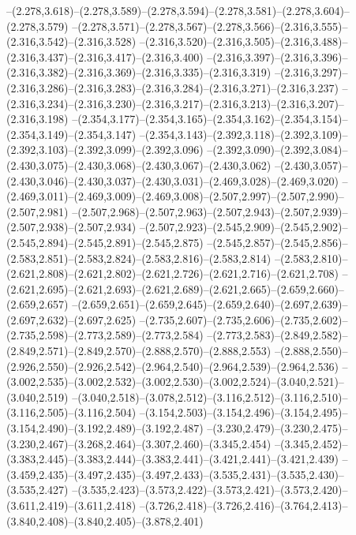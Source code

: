   --(2.278,3.618)--(2.278,3.589)--(2.278,3.594)--(2.278,3.581)--(2.278,3.604)--(2.278,3.579)%
  --(2.278,3.571)--(2.278,3.567)--(2.278,3.566)--(2.316,3.555)--(2.316,3.542)--(2.316,3.528)%
  --(2.316,3.520)--(2.316,3.505)--(2.316,3.488)--(2.316,3.437)--(2.316,3.417)--(2.316,3.400)%
  --(2.316,3.397)--(2.316,3.396)--(2.316,3.382)--(2.316,3.369)--(2.316,3.335)--(2.316,3.319)%
  --(2.316,3.297)--(2.316,3.286)--(2.316,3.283)--(2.316,3.284)--(2.316,3.271)--(2.316,3.237)%
  --(2.316,3.234)--(2.316,3.230)--(2.316,3.217)--(2.316,3.213)--(2.316,3.207)--(2.316,3.198)%
  --(2.354,3.177)--(2.354,3.165)--(2.354,3.162)--(2.354,3.154)--(2.354,3.149)--(2.354,3.147)%
  --(2.354,3.143)--(2.392,3.118)--(2.392,3.109)--(2.392,3.103)--(2.392,3.099)--(2.392,3.096)%
  --(2.392,3.090)--(2.392,3.084)--(2.430,3.075)--(2.430,3.068)--(2.430,3.067)--(2.430,3.062)%
  --(2.430,3.057)--(2.430,3.046)--(2.430,3.037)--(2.430,3.031)--(2.469,3.028)--(2.469,3.020)%
  --(2.469,3.011)--(2.469,3.009)--(2.469,3.008)--(2.507,2.997)--(2.507,2.990)--(2.507,2.981)%
  --(2.507,2.968)--(2.507,2.963)--(2.507,2.943)--(2.507,2.939)--(2.507,2.938)--(2.507,2.934)%
  --(2.507,2.923)--(2.545,2.909)--(2.545,2.902)--(2.545,2.894)--(2.545,2.891)--(2.545,2.875)%
  --(2.545,2.857)--(2.545,2.856)--(2.583,2.851)--(2.583,2.824)--(2.583,2.816)--(2.583,2.814)%
  --(2.583,2.810)--(2.621,2.808)--(2.621,2.802)--(2.621,2.726)--(2.621,2.716)--(2.621,2.708)%
  --(2.621,2.695)--(2.621,2.693)--(2.621,2.689)--(2.621,2.665)--(2.659,2.660)--(2.659,2.657)%
  --(2.659,2.651)--(2.659,2.645)--(2.659,2.640)--(2.697,2.639)--(2.697,2.632)--(2.697,2.625)%
  --(2.735,2.607)--(2.735,2.606)--(2.735,2.602)--(2.735,2.598)--(2.773,2.589)--(2.773,2.584)%
  --(2.773,2.583)--(2.849,2.582)--(2.849,2.571)--(2.849,2.570)--(2.888,2.570)--(2.888,2.553)%
  --(2.888,2.550)--(2.926,2.550)--(2.926,2.542)--(2.964,2.540)--(2.964,2.539)--(2.964,2.536)%
  --(3.002,2.535)--(3.002,2.532)--(3.002,2.530)--(3.002,2.524)--(3.040,2.521)--(3.040,2.519)%
  --(3.040,2.518)--(3.078,2.512)--(3.116,2.512)--(3.116,2.510)--(3.116,2.505)--(3.116,2.504)%
  --(3.154,2.503)--(3.154,2.496)--(3.154,2.495)--(3.154,2.490)--(3.192,2.489)--(3.192,2.487)%
  --(3.230,2.479)--(3.230,2.475)--(3.230,2.467)--(3.268,2.464)--(3.307,2.460)--(3.345,2.454)%
  --(3.345,2.452)--(3.383,2.445)--(3.383,2.444)--(3.383,2.441)--(3.421,2.441)--(3.421,2.439)%
  --(3.459,2.435)--(3.497,2.435)--(3.497,2.433)--(3.535,2.431)--(3.535,2.430)--(3.535,2.427)%
  --(3.535,2.423)--(3.573,2.422)--(3.573,2.421)--(3.573,2.420)--(3.611,2.419)--(3.611,2.418)%
  --(3.726,2.418)--(3.726,2.416)--(3.764,2.413)--(3.840,2.408)--(3.840,2.405)--(3.878,2.401)%
